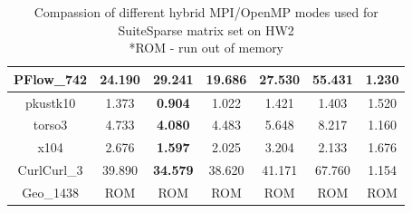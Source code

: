\begin{table}[h!]
\begin{tabular}{|c|c|c|c|c|c|c|}
\\ \hline
PFlow\_742                                            & 24.190                                                    & 29.241                                                     & \textbf{19.686}                                           & 27.530                                                     & 55.431                                                     & 1.230                                                           \\ \hline
pkustk10                                              & 1.373                                                     & \textbf{0.904}                                             & 1.022                                                     & 1.421                                                      & 1.403                                                      & 1.520                                                           \\ \hline
torso3                                                & 4.733                                                     & \textbf{4.080}                                             & 4.483                                                     & 5.648                                                      & 8.217                                                      & 1.160                                                           \\ \hline
x104                                                  & 2.676                                                     & \textbf{1.597}                                             & 2.025                                                     & 3.204                                                      & 2.133                                                      & 1.676                                                           \\ \hline
CurlCurl\_3                                           & 39.890                                                    & \textbf{34.579}                                            & 38.620                                                    & 41.171                                                     & 67.760                                                     & 1.154                                                           \\ \hline
Geo\_1438                                             & ROM                                                       & ROM                                                        & ROM                                                       & ROM                                                        & ROM                                                        & ROM                                                             \\ \hline
\end{tabular}
\caption{Compassion of different hybrid MPI/OpenMP modes used for SuiteSparse matrix set on HW2\\
*ROM - run out of memory}
\label{fig:mpi-omp-suitesparse-hw2}
\end{table}


